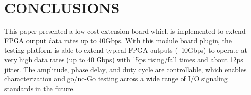 \documentclass{article}
\begin{document}
\section{CONCLUSIONS}
This paper presented a low cost extension board which is implemented to extend FPGA output data rates up to 40Gbps. With this module board plugin, the testing platform is able to extend typical FPGA outputs (~10Gbps) to operate at very high data rates (up to 40 Gbps) with 15ps rising/fall times and about 12ps jitter. The amplitude, phase delay, and duty cycle are controllable, which enables characterization and go/no-Go testing across a wide range of I/O signaling standards in the future. 





\end{document}
